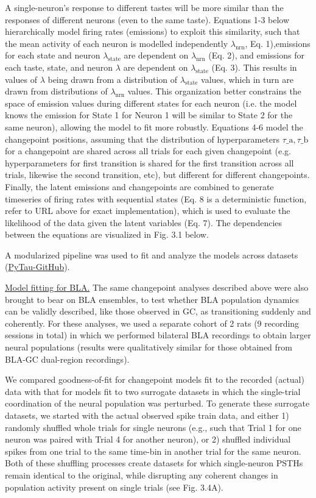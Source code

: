 \begin{refsection}
A single-neuron’s response to different tastes will be more similar than the responses of different neurons (even to the same taste). Equations 1-3 below hierarchically model firing rates (emissions) to exploit this similarity, such that the mean activity of each neuron is modelled independently $\lambda_\text{nrn}$, Eq. 1),emissions for each state and neuron $\lambda_\text{state}$ are dependent on $\lambda_\text{nrn}$ (Eq. 2), and emissions for each taste, state, and neuron $\lambda$ are dependent on $\lambda_\text{state}$ (Eq. 3). This results in values of $\lambda$ being drawn from a distribution of $\lambda_\text{state}$ values, which in turn are drawn from distributions of $\lambda_\text{nrn}$ values. This organization better constrains the space of emission values during different states for each neuron (i.e. the model knows the emission for State 1 for Neuron 1 will be similar to State 2 for the same neuron), allowing the model to fit more robustly. Equations 4-6 model the changepoint positions, assuming that the distribution of hyperparameters $\tau\text{_a}, \tau\text{_b}$ for a changepoint are shared across all trials for each given changepoint (e.g. hyperparameters for first transition is shared for the first transition across all trials, likewise the second transition, etc), but different for different changepoints. Finally, the latent emissions and changepoints are combined to generate timeseries of firing rates with sequential states (Eq. 8 is a deterministic function, refer to URL above for exact implementation), which is used to evaluate the likelihood of the data given the latent variables (Eq. 7). The dependencies between the equations are visualized in Fig. 3.1 below.
 
A modularized pipeline was used to fit and analyze the models across datasets (\href{https://github.com/abuzarmahmood/pytau/tree/development/pytau}{PyTau-GitHub}).

\noindent\underline{Model fitting for BLA.} The same changepoint analyses described above were also brought to bear on BLA ensembles, to test whether BLA population dynamics can be validly described, like those observed in GC, as transitioning suddenly and coherently. For these analyses, we used a separate cohort of 2 rats (9 recording sessions in total) in which we performed bilateral BLA recordings to obtain larger neural populations (results were qualitatively similar for those obtained from BLA-GC dual-region recordings). 

We compared goodness-of-fit for changepoint models fit to the recorded (actual) data with that for models fit to two surrogate datasets in which the single-trial coordination of the neural population was perturbed. To generate these surrogate datasets, we started with the actual observed spike train data, and either 1) randomly shuffled whole trials for single neurons (e.g., such that Trial 1 for one neuron was paired with Trial 4 for another neuron), or 2) shuffled individual spikes from one trial to the same time-bin in another trial for the same neuron. Both of these shuffling processes create datasets for which single-neuron PSTHs remain identical to the original, while disrupting any coherent changes in population activity present on single trials (see Fig. 3.4A).  


\end{refsection}
